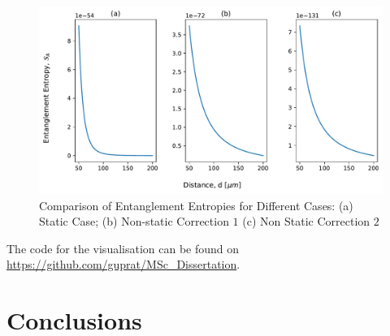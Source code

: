 \documentclass[12pt,a4paper]{report}
\theoremstyle{plain}
\theoremstyle{definition}
\theoremstyle{remark}
\begin{document}
\begin{figure}[h]
    \centering
    \includegraphics[width=15cm]{EECases.pdf}
    \caption{Comparison of Entanglement Entropies for Different Cases:  (a) Static Case; (b) Non-static Correction $1$ (c) Non Static Correction $2$}
    \label{fig:EE2}
\end{figure}
\newpage
The code for the visualisation can be found on \url{https://github.com/guprat/MSc_Dissertation}.
\newpage
\chapter{Conclusions}
\newpage

\newpage
\end{document}

